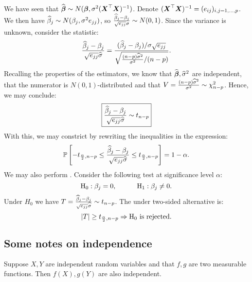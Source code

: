 We have seen that $\widehat{\boldsymbol{\beta}}\sim N(\boldsymbol{\beta}, \sigma^2(\boldsymbol{X}^\top\boldsymbol{X})^{-1})$. Denote $(\boldsymbol{X}^\top\boldsymbol{X})^{-1}=(e_{ij})_{i,j=1,\dots,p}$. We then have $\widehat{\beta}_j\sim N(\beta_j, \sigma^2 e_{jj})$, so $\frac{\widehat{\beta}_j-\beta_j}{\sqrt{e_{jj}}\sigma}\sim N(0,1)$. Since the variance is unknown, consider the statistic:
$$
    \frac{\widehat{\beta}_j-\beta_j}{\sqrt{e_{jj}}\widehat{\sigma}}
    =
    \frac{(\widehat{\beta}_j-\beta_j)/\sigma\sqrt{e_{jj}}}{\sqrt{\frac{(n-p)\widehat{\sigma}^2}{\sigma^2} / (n-p)}}.
$$
Recalling the properties of the estimators, we know that $\widehat{\boldsymbol{\beta}}, \widehat{\sigma}^2$ are independent, that the numerator is $N(0,1)$-distributed and that $V=\frac{(n-p)\widehat{\sigma}^2}{\sigma^2}\sim \chi^2_{n-p}$. Hence, we may conclude:
\begin{equation}
    \boxed{\frac{\widehat{\beta}_j-\beta_j}{\sqrt{e_{jj}}\widehat{\sigma}} \sim t_{n-p}}
\end{equation}
With this, we may constrict  by rewriting the inequalities in the expression:
$$
    \mathbb{P}\left[-t_{\frac{\alpha}{2},n-p} \leq \frac{\widehat{\beta}_j-\beta_j}{\sqrt{e_{jj}}\widehat{\sigma}} \leq t_{\frac{\alpha}{2}, n-p}\right] = 1-\alpha.
$$
We may also perform . Consider the following test at significance level $\alpha$:
$$
    \mathrm{H}_0 : \beta_j = 0, 
    \quad\quad\quad
    \mathrm{H}_1 : \beta_j \ne 0.
$$
Under $H_0$ we have $T=\frac{\widehat{\beta}_j-\beta_j}{\sqrt{e_{jj}}\widehat{\sigma}} \sim t_{n-p}$. The  under two-sided alternative is:
$$
    \lvert T \rvert \geq t_{\frac{\alpha}{2}, n-p} \Rightarrow \mathrm{H}_0 \textrm{ is rejected}.
$$
\subsection{Some notes on independence}


\begin{theorem}
    Suppose $X, Y$ are independent random variables and that $f, g$ are two measurable functions. Then $f(X), g(Y)$ are also independent. 
\end{theorem}

